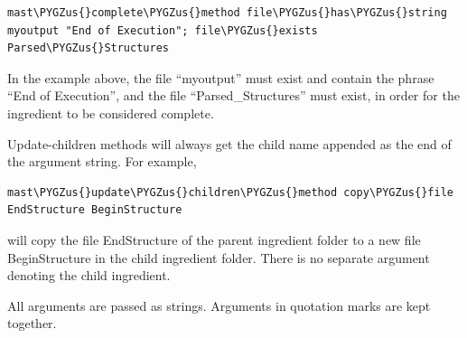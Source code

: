\documentclass[letterpaper,10pt,english]{sphinxmanual}
\def\PYGZus{\char`\_}
\begin{document}
\begin{Verbatim}[commandchars=\\\{\}]
mast\PYGZus{}complete\PYGZus{}method file\PYGZus{}has\PYGZus{}string myoutput "End of Execution"; file\PYGZus{}exists Parsed\PYGZus{}Structures
\end{Verbatim}

In the example above, the file ``myoutput'' must exist and contain the phrase ``End of Execution'', and the file ``Parsed\_Structures'' must exist, in order for the ingredient to be considered complete.

Update-children methods will always get the child name appended as the end of the argument string. For example,

\begin{Verbatim}[commandchars=\\\{\}]
mast\PYGZus{}update\PYGZus{}children\PYGZus{}method copy\PYGZus{}file EndStructure BeginStructure
\end{Verbatim}

will copy the file EndStructure of the parent ingredient folder to a new file BeginStructure in the child ingredient folder. There is no separate argument denoting the child ingredient.

All arguments are passed as strings. Arguments in quotation marks are kept together.
\end{document}
